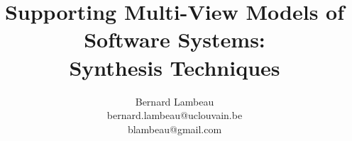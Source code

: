 \documentclass[dvips,a4paper,12pt]{report}
\begin{document}

\title{
  Supporting Multi-View Models of Software Systems: \\
  Synthesis Techniques
}
\author{Bernard Lambeau \\ bernard.lambeau@uclouvain.be \\ blambeau@gmail.com}
\maketitle


%

\tableofcontents











\end{document}
